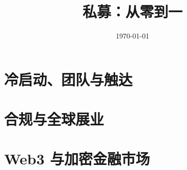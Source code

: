 \documentclass[UTF8,openany]{ctexbook}
\title{私募：从零到一}
\author{}
\date{\today}
\begin{document}
\frontmatter
\maketitle
\tableofcontents

\mainmatter

















\part{冷启动、团队与触达}



\part{合规与全球展业}








\part{Web3 与加密金融市场}





\backmatter
\end{document}
